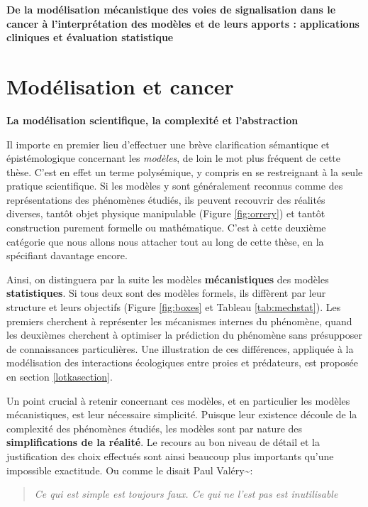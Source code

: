 \documentclass[a4paper,12pt,twoside,onecolumn,openright,final,oldfontcommands]{memoir}
\begin{document}
\textbf{De la modélisation mécanistique des voies de signalisation dans
le cancer à l'interprétation des modèles et de leurs apports :
applications cliniques et évaluation statistique}

\section{Modélisation et cancer}\label{moduxe9lisation-et-cancer}

\textbf{La modélisation scientifique, la complexité et l'abstraction}

Il importe en premier lieu d'effectuer une brève clarification
sémantique et épistémologique concernant les \emph{modèles}, de loin le
mot plus fréquent de cette thèse. C'est en effet un terme polysémique, y
compris en se restreignant à la seule pratique scientifique. Si les
modèles y sont généralement reconnus comme des représentations des
phénomènes étudiés, ils peuvent recouvrir des réalités diverses, tantôt
objet physique manipulable (Figure \ref{fig:orrery}) et tantôt
construction purement formelle ou mathématique. C'est à cette deuxième
catégorie que nous allons nous attacher tout au long de cette thèse, en
la spécifiant davantage encore.

Ainsi, on distinguera par la suite les modèles \textbf{mécanistiques}
des modèles \textbf{statistiques}. Si tous deux sont des modèles
formels, ils diffèrent par leur structure et leurs objectifs (Figure
\ref{fig:boxes} et Tableau \ref{tab:mechstat}). Les premiers cherchent à
représenter les mécanismes internes du phénomène, quand les deuxièmes
cherchent à optimiser la prédiction du phénomène sans présupposer de
connaissances particulières. Une illustration de ces différences,
appliquée à la modélisation des interactions écologiques entre proies et
prédateurs, est proposée en section \ref{lotkasection}.

Un point crucial à retenir concernant ces modèles, et en particulier les
modèles mécanistiques, est leur nécessaire simplicité. Puisque leur
existence découle de la complexité des phénomènes étudiés, les modèles
sont par nature des \textbf{simplifications de la réalité}. Le recours
au bon niveau de détail et la justification des choix effectués sont
ainsi beaucoup plus importants qu'une impossible exactitude. Ou comme le
disait Paul Valéry\textasciitilde{}:

\begin{quote}
\emph{Ce qui est simple est toujours faux. Ce qui ne l'est pas est
inutilisable}
\end{quote}
\end{document}
